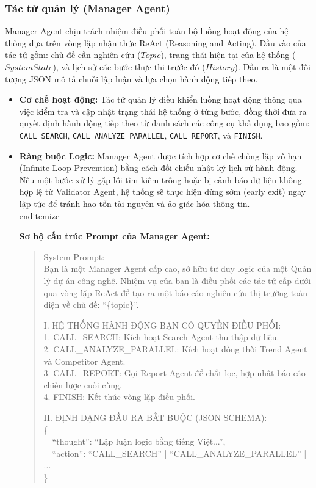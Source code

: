 \documentclass[11pt,a4paper]{article}
\begin{document}
\subsubsection{Tác tử quản lý (Manager Agent)}
Manager Agent chịu trách nhiệm điều phối toàn bộ luồng hoạt động của hệ thống dựa trên vòng lặp nhận thức ReAct (Reasoning and Acting). Đầu vào của tác tử gồm: chủ đề cần nghiên cứu ($Topic$), trạng thái hiện tại của hệ thống ($SystemState$), và lịch sử các bước thực thi trước đó ($History$). Đầu ra là một đối tượng JSON mô tả chuỗi lập luận và lựa chọn hành động tiếp theo.
\begin{itemize}
    \item \textbf{Cơ chế hoạt động:} Tác tử quản lý điều khiển luồng hoạt động thông qua việc kiểm tra và cập nhật trạng thái hệ thống ở từng bước, đồng thời đưa ra quyết định hành động tiếp theo từ danh sách các công cụ khả dụng bao gồm: \texttt{CALL\_SEARCH}, \texttt{CALL\_ANALYZE\_PARALLEL}, \texttt{CALL\_REPORT}, và \texttt{FINISH}.
    \item \textbf{Ràng buộc Logic:} Manager Agent được tích hợp cơ chế chống lặp vô hạn (Infinite Loop Prevention) bằng cách đối chiếu nhật ký lịch sử hành động. Nếu một bước xử lý gặp lỗi tìm kiếm trống hoặc bị cảnh báo dữ liệu không hợp lệ từ Validator Agent, hệ thống sẽ thực hiện dừng sớm (early exit) ngay lập tức để tránh hao tổn tài nguyên và ảo giác hóa thông tin.
\\end{itemize}

\noindent\textbf{Sơ bộ cấu trúc Prompt của Manager Agent:}
\begin{quote}
\footnotesize\ttfamily
System Prompt:\\
Bạn là một Manager Agent cấp cao, sở hữu tư duy logic của một Quản lý dự án công nghệ. Nhiệm vụ của bạn là điều phối các tác tử cấp dưới qua vòng lặp ReAct để tạo ra một báo cáo nghiên cứu thị trường toàn diện về chủ đề: ``\{topic\}''.\par
\medskip
I. HỆ THỐNG HÀNH ĐỘNG BẠN CÓ QUYỀN ĐIỀU PHỐI:\\
1. CALL\_SEARCH: Kích hoạt Search Agent thu thập dữ liệu.\\
2. CALL\_ANALYZE\_PARALLEL: Kích hoạt đồng thời Trend Agent và Competitor Agent.\\
3. CALL\_REPORT: Gọi Report Agent để chắt lọc, hợp nhất báo cáo chiến lược cuối cùng.\\
4. FINISH: Kết thúc vòng lặp điều phối.\par
\medskip
II. ĐỊNH DẠNG ĐẦU RA BẮT BUỘC (JSON SCHEMA):\\
\{\\
\ \ ``thought'': ``Lập luận logic bằng tiếng Việt...'',\\
\ \ ``action'': ``CALL\_SEARCH'' | ``CALL\_ANALYZE\_PARALLEL'' | ...\\
\}
\end{quote}


\end{itemize}
\end{document}
